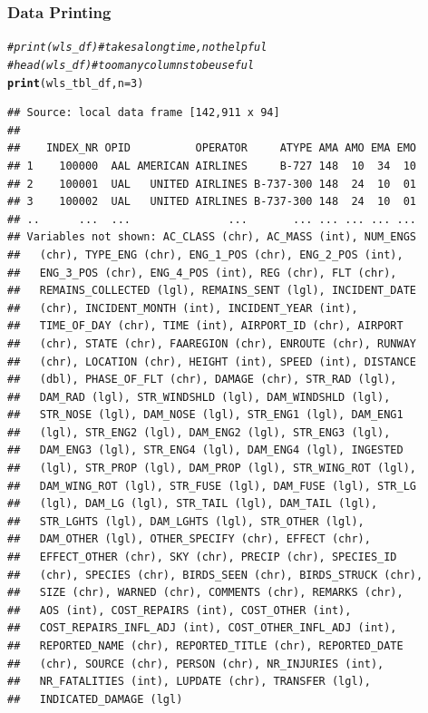 \documentclass{beamer}\usepackage[]{graphicx}\usepackage[]{color}
\makeatletter
\newcommand{\hlnum}[1]{\textcolor[rgb]{0.686,0.059,0.569}{#1}}%
\newcommand{\hlcom}[1]{\textcolor[rgb]{0.678,0.584,0.686}{\textit{#1}}}%
\newcommand{\hlstd}[1]{\textcolor[rgb]{0.345,0.345,0.345}{#1}}%
\newcommand{\hlkwc}[1]{\textcolor[rgb]{0.333,0.667,0.333}{#1}}%
\newcommand{\hlkwd}[1]{\textcolor[rgb]{0.737,0.353,0.396}{\textbf{#1}}}%
\newenvironment{kframe}{%
 \def\at@end@of@kframe{}%
 \ifinner\ifhmode%
  \def\at@end@of@kframe{\end{minipage}}%
  \begin{minipage}{\columnwidth}%
 \fi\fi%
 \def\FrameCommand##1{\hskip\@totalleftmargin \hskip-\fboxsep
 \colorbox{shadecolor}{##1}\hskip-\fboxsep
     \hskip-\linewidth \hskip-\@totalleftmargin \hskip\columnwidth}%
 \MakeFramed {\advance\hsize-\width
   \@totalleftmargin\z@ \linewidth\hsize
   \@setminipage}}%
 {\par\unskip\endMakeFramed%
 \at@end@of@kframe}
\newenvironment{knitrout}{}{} %
\makeatother
\begin{document}
\begin{frame}[fragile]
  \frametitle{Data Printing}
\begin{knitrout}\footnotesize
{}\color{fgcolor}\begin{kframe}
\begin{alltt}
\hlcom{# print(wls_df)  # takes a long time, not helpful}
\hlcom{# head(wls_df)   # too many columns to be useful}
\hlkwd{print}\hlstd{(wls_tbl_df,} \hlkwc{n} \hlstd{=} \hlnum{3}\hlstd{)}
\end{alltt}
\begin{verbatim}
## Source: local data frame [142,911 x 94]
## 
##    INDEX_NR OPID          OPERATOR     ATYPE AMA AMO EMA EMO
## 1    100000  AAL AMERICAN AIRLINES     B-727 148  10  34  10
## 2    100001  UAL   UNITED AIRLINES B-737-300 148  24  10  01
## 3    100002  UAL   UNITED AIRLINES B-737-300 148  24  10  01
## ..      ...  ...               ...       ... ... ... ... ...
## Variables not shown: AC_CLASS (chr), AC_MASS (int), NUM_ENGS
##   (chr), TYPE_ENG (chr), ENG_1_POS (chr), ENG_2_POS (int),
##   ENG_3_POS (chr), ENG_4_POS (int), REG (chr), FLT (chr),
##   REMAINS_COLLECTED (lgl), REMAINS_SENT (lgl), INCIDENT_DATE
##   (chr), INCIDENT_MONTH (int), INCIDENT_YEAR (int),
##   TIME_OF_DAY (chr), TIME (int), AIRPORT_ID (chr), AIRPORT
##   (chr), STATE (chr), FAAREGION (chr), ENROUTE (chr), RUNWAY
##   (chr), LOCATION (chr), HEIGHT (int), SPEED (int), DISTANCE
##   (dbl), PHASE_OF_FLT (chr), DAMAGE (chr), STR_RAD (lgl),
##   DAM_RAD (lgl), STR_WINDSHLD (lgl), DAM_WINDSHLD (lgl),
##   STR_NOSE (lgl), DAM_NOSE (lgl), STR_ENG1 (lgl), DAM_ENG1
##   (lgl), STR_ENG2 (lgl), DAM_ENG2 (lgl), STR_ENG3 (lgl),
##   DAM_ENG3 (lgl), STR_ENG4 (lgl), DAM_ENG4 (lgl), INGESTED
##   (lgl), STR_PROP (lgl), DAM_PROP (lgl), STR_WING_ROT (lgl),
##   DAM_WING_ROT (lgl), STR_FUSE (lgl), DAM_FUSE (lgl), STR_LG
##   (lgl), DAM_LG (lgl), STR_TAIL (lgl), DAM_TAIL (lgl),
##   STR_LGHTS (lgl), DAM_LGHTS (lgl), STR_OTHER (lgl),
##   DAM_OTHER (lgl), OTHER_SPECIFY (chr), EFFECT (chr),
##   EFFECT_OTHER (chr), SKY (chr), PRECIP (chr), SPECIES_ID
##   (chr), SPECIES (chr), BIRDS_SEEN (chr), BIRDS_STRUCK (chr),
##   SIZE (chr), WARNED (chr), COMMENTS (chr), REMARKS (chr),
##   AOS (int), COST_REPAIRS (int), COST_OTHER (int),
##   COST_REPAIRS_INFL_ADJ (int), COST_OTHER_INFL_ADJ (int),
##   REPORTED_NAME (chr), REPORTED_TITLE (chr), REPORTED_DATE
##   (chr), SOURCE (chr), PERSON (chr), NR_INJURIES (int),
##   NR_FATALITIES (int), LUPDATE (chr), TRANSFER (lgl),
##   INDICATED_DAMAGE (lgl)
\end{verbatim}
\end{kframe}
\end{knitrout}
\end{frame} 
\end{document}
